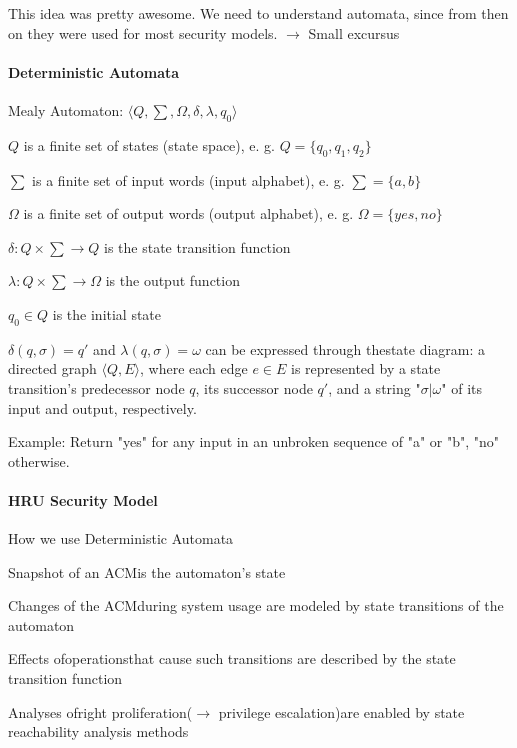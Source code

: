 \documentclass[a4paper]{article}
\begin{document}
\begin{multicols}{3}
    This idea was pretty awesome. We need to understand automata, since from then on they were used for most security models. $\rightarrow$  Small excursus

    \paragraph{Deterministic Automata}
    Mealy Automaton: $⟨Q,\sum,\Omega,\delta,\lambda,q_0⟩$
    \begin{itemize*}
        \item $Q$ is a finite set of states (state space), e. g. $Q=\{q_0 ,q_1 ,q_2\}$
        \item $\sum$ is a finite set of input words (input alphabet), e. g. $\sum=\{a,b\}$
        \item $\Omega$ is a finite set of output words (output alphabet), e. g. $\Omega=\{yes,no\}$
        \item $\delta:Q\times\sum\rightarrow Q$ is the state transition function
        \item $\lambda:Q\times\sum\rightarrow\Omega$ is the output function
        \item $q_0\in Q$ is the initial state
        \item $\delta(q,\sigma)=q'$ and $\lambda(q,\sigma)=\omega$ can be expressed through thestate diagram: a directed graph $⟨Q,E⟩$, where each edge $e\in E$ is represented by a state transition’s predecessor node $q$, its successor node $q'$, and a string "$\sigma|\omega$" of its input and output, respectively.
    \end{itemize*}

    Example: Return "yes" for any input in an unbroken sequence of "a" or "b", "no" otherwise.

    \paragraph{HRU Security Model}
    How we use Deterministic Automata
    \begin{itemize*}
        \item Snapshot of an ACMis the automaton’s state
        \item Changes of the ACMduring system usage are modeled by state transitions of the automaton
        \item Effects ofoperationsthat cause such transitions are described by the state transition function
        \item Analyses ofright proliferation($\rightarrow$  privilege escalation)are enabled by state reachability analysis methods
    \end{itemize*}


\end{multicols}
\end{document}
